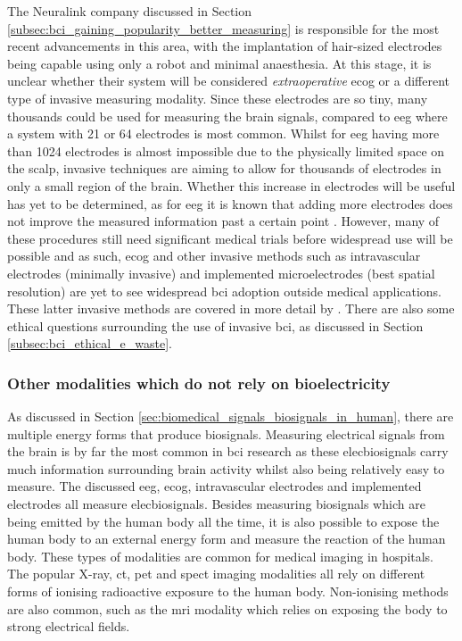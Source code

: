 The Neuralink company discussed in Section \ref{subsec:bci_gaining_popularity_better_measuring} is responsible for the most recent advancements in this area, with the implantation of hair-sized electrodes being capable using only a robot and minimal anaesthesia.
At this stage, it is unclear whether their system will be considered \textit{extraoperative} \gls{ecog} or a different type of invasive measuring modality.
Since these electrodes are so tiny, many thousands could be used for measuring the brain signals, compared to \gls{eeg} where a system with 21 or 64 electrodes is most common.
Whilst for \gls{eeg} having more than 1024 electrodes is almost impossible due to the physically limited space on the scalp, invasive techniques are aiming to allow for thousands of electrodes in only a small region of the brain.
Whether this increase in electrodes will be useful has yet to be determined, as for \gls{eeg} it is known that adding more electrodes does not improve the measured information past a certain point \citep{dropping_curve_eeg_lectrodes, more_electrodes_not_better}.
However, many of these procedures still need significant medical trials before widespread use will be possible and as such, \gls{ecog} and other invasive methods such as intravascular electrodes (minimally invasive) and implemented microelectrodes (best spatial resolution) are yet to see widespread \gls{bci} adoption outside medical applications.
These latter invasive methods are covered in more detail by \citet{modalities_review1}.
There are also some ethical questions surrounding the use of invasive \gls{bci}, as discussed in Section \ref{subsec:bci_ethical_e_waste}.



\subsubsection{Other modalities which do not rely on bioelectricity}
\label{subsubsec:biomedical_signals_measuring_brain_modalities_others}

As discussed in Section \ref{sec:biomedical_signals_biosignals_in_human}, there are multiple energy forms that produce \glspl{biosignal}.
Measuring electrical signals from the brain is by far the most common in \gls{bci} research as these \glspl{elecbiosignal} carry much information surrounding brain activity whilst also being relatively easy to measure.
The discussed \gls{eeg}, \gls{ecog}, intravascular electrodes and implemented electrodes all measure \glspl{elecbiosignal}.
Besides measuring \glspl{biosignal} which are being emitted by the human body all the time, it is also possible to expose the human body to an external energy form and measure the reaction of the human body.
These types of modalities are common for medical imaging in hospitals.
The popular X-ray, \gls{ct}, \gls{pet} and \gls{spect} imaging modalities all rely on different forms of ionising radioactive exposure to the human body.
Non-ionising methods are also common, such as the \gls{mri} modality which relies on exposing the body to strong electrical fields.

